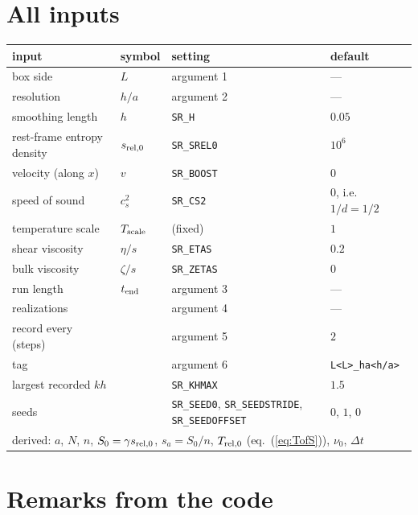 \documentclass[11pt,aps,preprint,nofootinbib,superscriptaddress,tightenlines]{revtex4-2}
\def\Eq#1{eq.~(\ref{#1})}
\begin{document}
\section{All inputs}
\label{sec:table}

\begin{center}\small
\begin{tabular}{llll}
\toprule
input & symbol & setting & default \\ \midrule
box side & $L$ & argument 1 & --- \\
resolution & $h/a$ & argument 2 & --- \\
smoothing length & $h$ & \texttt{SR\_H} & $0.05$ \\
rest-frame entropy density & $s_{\rm rel,0}$ & \texttt{SR\_SREL0} & $10^6$ \\
velocity (along $x$) & $v$ & \texttt{SR\_BOOST} & $0$ \\
speed of sound & $c_s^2$ & \texttt{SR\_CS2} & $0$, i.e.\ $1/d=1/2$ \\
temperature scale & $T_{\rm scale}$ & (fixed) & $1$ \\
shear viscosity & $\eta/s$ & \texttt{SR\_ETAS} & $0.2$ \\
bulk viscosity & $\zeta/s$ & \texttt{SR\_ZETAS} & $0$ \\
run length & $t_{\rm end}$ & argument 3 & --- \\
realizations & & argument 4 & --- \\
record every (steps) & & argument 5 & $2$ \\
tag & & argument 6 & \texttt{L<L>\_ha<h/a>} \\
largest recorded $kh$ & & \texttt{SR\_KHMAX} & $1.5$ \\
seeds & & \texttt{SR\_SEED0}, \texttt{SR\_SEEDSTRIDE}, \texttt{SR\_SEEDOFFSET} & $0$, $1$, $0$ \\
\midrule
\multicolumn{4}{l}{derived: $a$, $N$, $n$, $S_0=\gamma s_{\rm rel,0}$, $s_a=S_0/n$, $T_{\rm rel,0}$ (\Eq{eq:TofS}), $\nu_0$, $\Delta t$} \\
\bottomrule
\end{tabular}
\end{center}

\section{Remarks from the code}
\label{sec:remarks}
\end{document}
